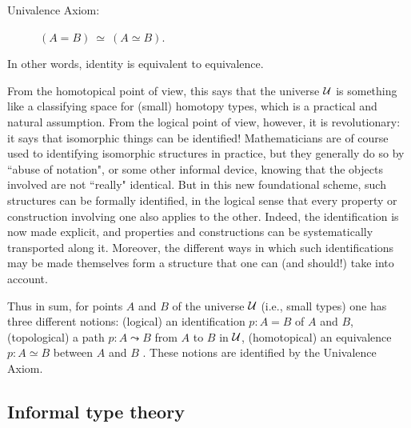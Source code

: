{\begin{description}
\item[Univalence Axiom:]  $(A = B)\ \simeq\ (A\simeq B)$.
\end{description}
%
In other words, identity is equivalent to equivalence. 

From the homotopical point of view, this says that the universe ${\mathcal U}$ is something like a classifying space for (small) homotopy types, which is a practical and natural assumption.  From the  logical point of view, however, it is revolutionary: it says that isomorphic things can be identified!  Mathematicians are of course used to identifying isomorphic structures in practice, but they generally do so by ``abuse of notation", or some other informal device, knowing that the objects involved are not ``really" identical.  But in this new foundational scheme, such structures can be formally identified, in the logical sense that every property or construction involving one also applies to the other. Indeed, the identification is now made explicit, and properties and constructions can be systematically transported along it.  Moreover, the different ways in which such identifications may be made themselves form a structure that one can (and should!) take into account.

Thus in sum, for points  $A$ and $B$ of the universe ${\mathcal U}$ (i.e., small types) one has three different notions: (logical) an identification $p:A=B$ of $A$ and $B$, (topological) a path $p:A \leadsto B$ from $A$ to $B$ in ${\mathcal U}$, (homotopical) an equivalence $p:A\simeq B$ between $A$ and $B$ .  These notions are identified by the Univalence Axiom.


\subsection*{Informal type theory}

}

